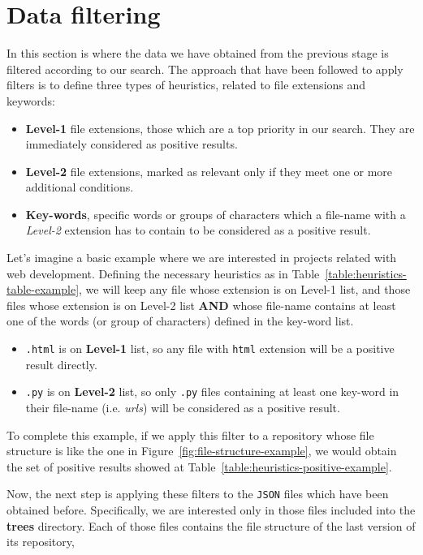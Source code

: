 \documentclass[a4paper, 12pt]{book}
\begin{document}
\section{Data filtering}
\label{sec:data-filtering}
In this section is where the data we have obtained from the previous stage is filtered according to our search.
The approach that have been followed to apply filters is to define three types of heuristics, related to
file extensions and keywords:
\begin{itemize}
  \item \textbf{Level-1} file extensions, those which are a top priority in our search. They are immediately considered
   as positive results.
  \item \textbf{Level-2} file extensions, marked as relevant only if they meet one or more additional conditions.
  \item \textbf{Key-words}, specific words or groups of characters which a file-name with a \textit{Level-2} extension
  has to contain to be considered as a positive result.
\end{itemize}
Let's imagine a basic example where we are interested in projects related with web development. Defining the
necessary heuristics as in Table~\ref{table:heuristics-table-example}, we will keep any file whose extension
is on Level-1 list, and those files whose extension is on Level-2 list \textbf{AND} whose file-name contains at least one
of the words (or group of characters) defined in the key-word list.\\
\begin{itemize}
  \item \texttt{.html} is on \textbf{Level-1} list, so any file with \texttt{html} extension will be a positive result directly.
  \item \texttt{.py} is on \textbf{Level-2} list, so only \texttt{.py} files containing at least one key-word in their file-name
  (i.e. \textit{urls}) will be considered as a positive result.
\end{itemize}
To complete this example, if we apply this filter to a repository whose file structure is like the one in Figure~\ref{fig:file-structure-example},
we would obtain the set of positive results showed at Table~\ref{table:heuristics-positive-example}.\par
Now, the next step is applying these filters to the \texttt{JSON} files which have been obtained before.
Specifically, we are interested only in those files included into the \textbf{trees} directory.
Each of those files contains the file structure of the last version of its repository,
\end{document}
